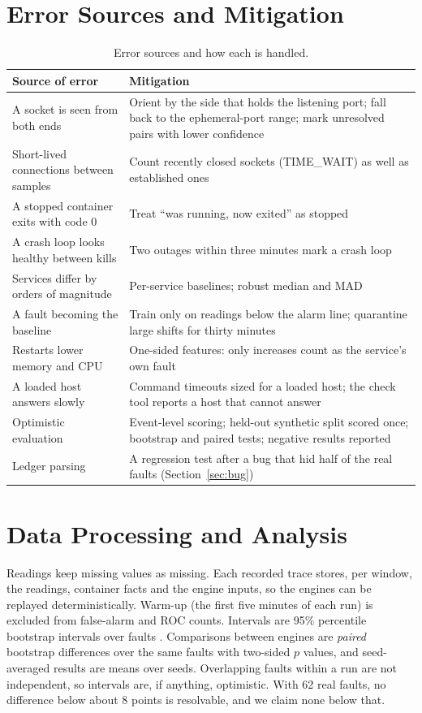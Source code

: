 \section{Error Sources and Mitigation}
\begin{table}[!htbp]
\centering
\caption{Error sources and how each is handled.}
\label{tab:errors}
\small
\renewcommand{\arraystretch}{1.2}
\begin{tabularx}{\textwidth}{>{\raggedright\arraybackslash}p{3.7cm}>{\raggedright\arraybackslash}X}
\toprule
\textbf{Source of error} & \textbf{Mitigation}\\
\midrule
A socket is seen from both ends & Orient by the side that holds the listening port; fall back to the ephemeral-port range; mark unresolved pairs with lower confidence\\
Short-lived connections between samples & Count recently closed sockets (TIME\_WAIT) as well as established ones\\
A stopped container exits with code 0 & Treat ``was running, now exited'' as stopped\\
A crash loop looks healthy between kills & Two outages within three minutes mark a crash loop\\
Services differ by orders of magnitude & Per-service baselines; robust median and MAD\\
A fault becoming the baseline & Train only on readings below the alarm line; quarantine large shifts for thirty minutes\\
Restarts lower memory and CPU & One-sided features: only increases count as the service's own fault\\
A loaded host answers slowly & Command timeouts sized for a loaded host; the check tool reports a host that cannot answer\\
Optimistic evaluation & Event-level scoring; held-out synthetic split scored once; bootstrap and paired tests; negative results reported\\
Ledger parsing & A regression test after a bug that hid half of the real faults (Section~\ref{sec:bug})\\
\bottomrule
\end{tabularx}
\end{table}

\section{Data Processing and Analysis}
Readings keep missing values as missing. Each recorded trace stores, per window, the readings, container facts and the engine inputs, so the engines can be replayed deterministically. Warm-up (the first five minutes of each run) is excluded from false-alarm and ROC counts. Intervals are 95\% percentile bootstrap intervals over faults \cite{efron1979bootstrap}. Comparisons between engines are \emph{paired} bootstrap differences over the same faults with two-sided $p$ values, and seed-averaged results are means over seeds. Overlapping faults within a run are not independent, so intervals are, if anything, optimistic. With 62 real faults, no difference below about 8 points is resolvable, and we claim none below that.


